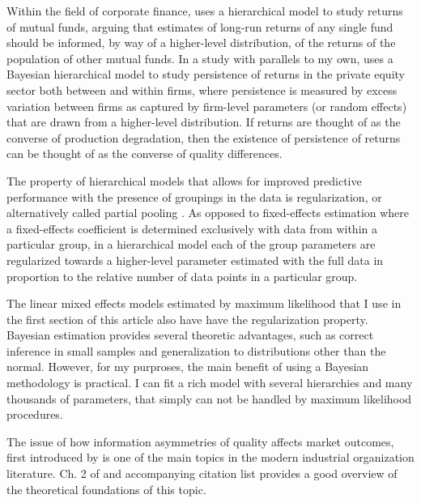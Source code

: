 \documentclass[a4paper]{article}
\begin{document}
Within the field of corporate finance, \citet{jones_mutual_2005} uses a hierarchical model to study returns of mutual funds, arguing that estimates of long-run returns of any single fund should be informed, by way of a higher-level distribution, of the returns of the population of other mutual funds. In a study with parallels to my own, \citet{korteweg_skill_2017} uses a Bayesian hierarchical model to study persistence of returns in the private equity sector both between and within firms, where persistence is measured by excess variation between firms as captured by firm-level parameters (or random effects) that are drawn from a higher-level distribution. If returns are thought of as the converse of production degradation, then the existence of persistence of returns can be thought of as the converse of quality differences.




The property of hierarchical models that allows for improved predictive performance with the presence of groupings in the data is regularization, or alternatively called partial pooling \citep{gelman_bayesian_2013}. As opposed to fixed-effects estimation where a fixed-effects coefficient is determined exclusively with data from within a particular group, in a hierarchical model each of the group parameters are regularized towards a higher-level parameter estimated with the full data in proportion to the relative number of data points in a particular group.

The linear mixed effects models estimated by maximum likelihood that I use in the first section of this article also have have the regularization property. Bayesian estimation provides several theoretic advantages, such as correct inference in small samples and generalization to distributions other than the normal. However, for my purproses, the main benefit of using a Bayesian methodology is practical. I can fit a rich model with several hierarchies and many thousands of parameters, that simply can not be handled by maximum likelihood procedures.

The issue of how information asymmetries of quality affects market outcomes, first introduced by \citet{akerlof_market_1970} is one of the main topics in the modern industrial organization literature. Ch. 2 of \citet{tirole_theory_1988} and accompanying citation list provides a good overview of the theoretical foundations of this topic.
\end{document}
